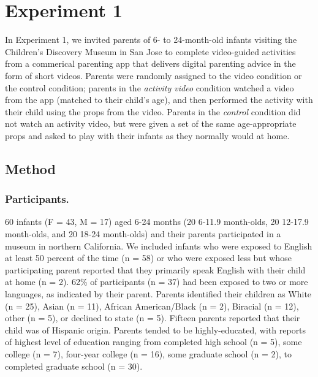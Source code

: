 \documentclass[man,floatsintext]{apa6}
\begin{document}
\hypertarget{experiment-1}{%
\section{Experiment 1}\label{experiment-1}}

In Experiment 1, we invited parents of 6- to 24-month-old infants visiting the Children's Discovery Museum in San Jose to complete video-guided activities from a commerical parenting app that delivers digital parenting advice in the form of short videos.
Parents were randomly assigned to the video condition or the control condition; parents in the \emph{activity video} condition watched a video from the app (matched to their child's age), and then performed the activity with their child using the props from the video.
Parents in the \emph{control} condition did not watch an activity video, but were given a set of the same age-appropriate props and asked to play with their infants as they normally would at home.

\hypertarget{method}{%
\subsection{Method}\label{method}}

\hypertarget{participants.}{%
\subsubsection{Participants.}\label{participants.}}

60 infants (F = 43, M = 17) aged 6-24 months (20 6-11.9 month-olds, 20 12-17.9 month-olds, and 20 18-24 month-olds) and their parents participated in a museum in northern California.
We included infants who were exposed to English at least 50 percent of the time (n = 58) or who were exposed less but whose participating parent reported that they primarily speak English with their child at home (n = 2).
62\% of participants (n = 37) had been exposed to two or more languages, as indicated by their parent.
Parents identified their children as White (n = 25), Asian (n = 11), African American/Black (n = 2), Biracial (n = 12), other (n = 5), or declined to state (n = 5).
Fifteen parents reported that their child was of Hispanic origin.
Parents tended to be highly-educated, with reports of highest level of education ranging from completed high school (n = 5), some college (n = 7), four-year college (n = 16), some graduate school (n = 2), to completed graduate school (n = 30).
\end{document}
